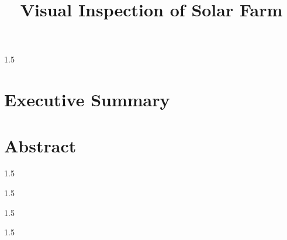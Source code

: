 \documentclass[12pt,oneside,a4paper]{book} %
\title{Visual Inspection of Solar Farm}
\begin{document}
\NoBgThispage%
\maketitle
\newpage
\ifDrf
\else
\begin{spacing}{1.5}

\ifINT
\else
\newpage

\fi
\newpage
\ifINT

\else

\fi
\newpage
{}
\ifINT
\chapter*{Executive Summary}

\else
\chapter*{Abstract}

\fi

\end{spacing}
\newpage
\pagestyle{fplain}
\begin{spacing}{1.5}
	\tableofcontents	
\end{spacing}
\newpage
\begin{spacing}{1.5}
	\cleardoublepage
	\listoffigures	
\end{spacing}
\newpage
\begin{spacing}{1.5}
	\cleardoublepage
	\listoftables
\end{spacing}
\fi
\mainmatter
\pagestyle{mplain}
\glsresetall
\begin{spacing}{1.5}
\ifINT

\else

\fi

\ifINT

\else

\fi

\ifINT

\else

\fi

\ifINT

\else

\fi

\ifINT
\else

\fi

\ifINT
\else

\fi

\ifINT
\else

\fi



\end{spacing}
\end{document}
